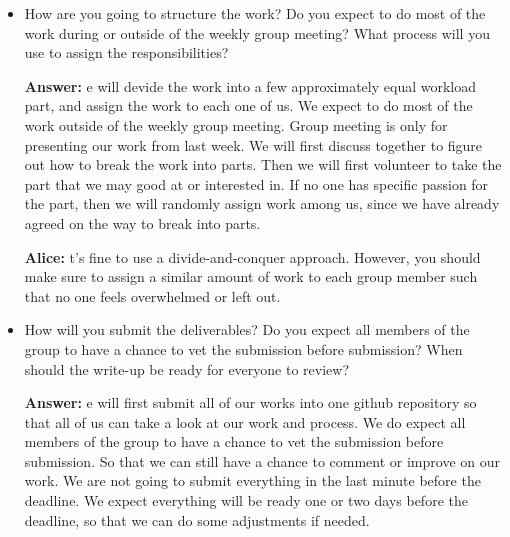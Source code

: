 \documentclass[12pt]{article}
\newenvironment{answer}[1]{
\color{blue}
	{\bf Answer:}
}{
}
\newenvironment{alice}[1]{
\color{magenta}
	{\bf Alice:}
}{
}
\begin{document}
\begin{itemize}
\begin{alice}
You need to figure out a good way to structure your meetings so that you will get the most out of each meeting.  In addition, you need to figure out a way to make decisions when there is disagreement within the group.  For instance, do you always require consensus before making a decision or are you comfortable with making a decision based on majority vote?  
\end{alice}

\item How are you going to structure the work? Do you expect to do most of the work during or outside of the weekly group meeting? What process will you use to assign the responsibilities?

\begin{answer}

We will devide the work into a few approximately equal workload part, and assign the work to each one of us. We expect to do most of the work outside of the weekly group meeting. Group meeting is only for presenting our work from last week.
We will first discuss together to figure out how to break the work into parts. Then we will first volunteer to take the part that we may good at or interested in. If no one has specific passion for the part, then we will randomly assign work among us, since we have already agreed on the way to break into parts.
\end{answer}

\begin{alice}

It's fine to use a divide-and-conquer approach.  However, you should make sure to assign a similar amount of work to each group member such that no one feels overwhelmed or left out.  
\end{alice}

\item How will you submit the deliverables? Do you expect all members of the group to have a chance to vet the submission before submission? When should the write-up be ready for everyone to review?

\begin{answer}

We will first submit all of our works into one github repository so that all of us can take a look at our work and process. We do expect all members of the group to have a chance to vet the submission before submission. So that we can still have a chance to comment or improve on our work.
We are not going to submit everything in the last minute before the deadline. We expect everything will be ready one or two days before the deadline, so that we can do some adjustments if needed.
\end{answer}


\end{itemize}
\end{document}

